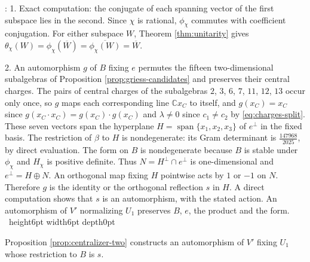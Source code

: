 \documentclass[leqno]{article}
\newcommand{\Cbb}{\ensuremath{\mathbb{C}}}
\newcommand{\qed}{\hfill \vrule height6pt  width6pt depth0pt}
\newenvironment{proof}[1][]{\noindent {\it Proof #1} : }{\hbox{~}\qed
\smallskip
}
\numberwithin{equation}{section}
\begin{document}
\begin{proof}
1. Exact computation: the conjugate of each spanning vector of the first subspace lies in the second. Since $\chi$ is rational, $\phi_\chi$ commutes with coefficient conjugation. For either subspace $W$, Theorem \ref{thm:unitarity} gives $\theta_\chi(W) = \phi_\chi(\overline W) = \overline{\phi_\chi(W)} = \overline W$.

2. An automorphism $g$ of $B$ fixing $e$ permutes the fifteen two-dimensional subalgebras of Proposition \ref{prop:griess-candidates} and preserves their central charges. The pairs of central charges of the subalgebras $2$, $3$, $6$, $7$, $11$, $12$, $13$ occur only once, so $g$ maps each corresponding line $\Cbb x_C$ to itself, and $g(x_C) = x_C$ since $g(x_C \cdot x_C) = g(x_C) \cdot g(x_C)$ and $\lambda \neq 0$ since $c_1 \neq c_2$ by \eqref{eq:charges-split}. These seven vectors span the hyperplane $H = \operatorname{span}\{x_1,x_2,x_3\}$ of $e^\perp$ in the fixed basis. The restriction of $\beta$ to $H$ is nondegenerate: its Gram determinant is $\frac{147968}{2025}$, by direct evaluation. The form on $B$ is nondegenerate because $B$ is stable under $\phi_\chi$ and $H_\chi$ is positive definite. Thus $N = H^\perp \cap e^\perp$ is one-dimensional and $e^\perp = H \oplus N$. An orthogonal map fixing $H$ pointwise acts by $1$ or $-1$ on $N$. Therefore $g$ is the identity or the orthogonal reflection $s$ in $H$. A direct computation shows that $s$ is an automorphism, with the stated action. An automorphism of $V'$ normalizing $U_1$ preserves $B$, $e$, the product and the form.
\end{proof}

Proposition \ref{prop:centralizer-two} constructs an automorphism of $V'$ fixing $U_1$ whose restriction to $B$ is $s$.
\end{document}
